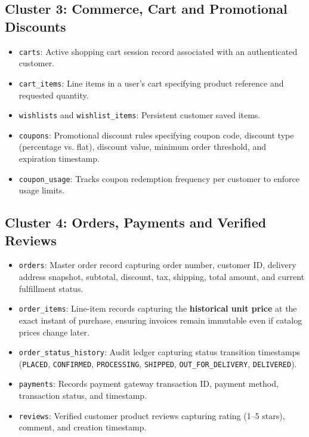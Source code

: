 \subsection{Cluster 3: Commerce, Cart and Promotional Discounts}
\begin{itemize}[leftmargin=2.0em]
    \item \texttt{carts}: Active shopping cart session record associated with an authenticated customer.
    \item \texttt{cart\_items}: Line items in a user's cart specifying product reference and requested quantity.
    \item \texttt{wishlists} and \texttt{wishlist_items}: Persistent customer saved items.
    \item \texttt{coupons}: Promotional discount rules specifying coupon code, discount type (percentage vs. flat), discount value, minimum order threshold, and expiration timestamp.
    \item \texttt{coupon\_usage}: Tracks coupon redemption frequency per customer to enforce usage limits.
\end{itemize}

\subsection{Cluster 4: Orders, Payments and Verified Reviews}
\begin{itemize}[leftmargin=2.0em]
    \item \texttt{orders}: Master order record capturing order number, customer ID, delivery address snapshot, subtotal, discount, tax, shipping, total amount, and current fulfillment status.
    \item \texttt{order\_items}: Line-item records capturing the \textbf{historical unit price} at the exact instant of purchase, ensuring invoices remain immutable even if catalog prices change later.
    \item \texttt{order\_status\_history}: Audit ledger capturing status transition timestamps (\texttt{PLACED}, \texttt{CONFIRMED}, \texttt{PROCESSING}, \texttt{SHIPPED}, \texttt{OUT\_FOR\_DELIVERY}, \texttt{DELIVERED}).
    \item \texttt{payments}: Records payment gateway transaction ID, payment method, transaction status, and timestamp.
    \item \texttt{reviews}: Verified customer product reviews capturing rating (1--5 stars), comment, and creation timestamp.
\end{itemize}

